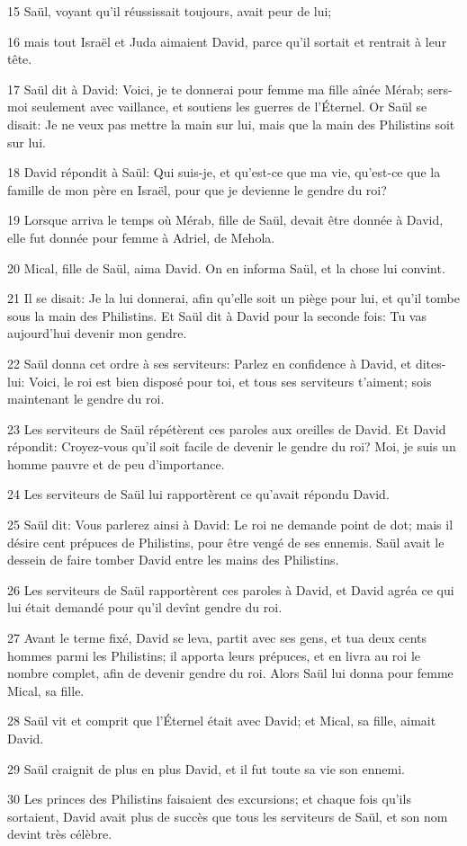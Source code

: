 \par 15 Saül, voyant qu'il réussissait toujours, avait peur de lui;
\par 16 mais tout Israël et Juda aimaient David, parce qu'il sortait et rentrait à leur tête.
\par 17 Saül dit à David: Voici, je te donnerai pour femme ma fille aînée Mérab; sers-moi seulement avec vaillance, et soutiens les guerres de l'Éternel. Or Saül se disait: Je ne veux pas mettre la main sur lui, mais que la main des Philistins soit sur lui.
\par 18 David répondit à Saül: Qui suis-je, et qu'est-ce que ma vie, qu'est-ce que la famille de mon père en Israël, pour que je devienne le gendre du roi?
\par 19 Lorsque arriva le temps où Mérab, fille de Saül, devait être donnée à David, elle fut donnée pour femme à Adriel, de Mehola.
\par 20 Mical, fille de Saül, aima David. On en informa Saül, et la chose lui convint.
\par 21 Il se disait: Je la lui donnerai, afin qu'elle soit un piège pour lui, et qu'il tombe sous la main des Philistins. Et Saül dit à David pour la seconde fois: Tu vas aujourd'hui devenir mon gendre.
\par 22 Saül donna cet ordre à ses serviteurs: Parlez en confidence à David, et dites-lui: Voici, le roi est bien disposé pour toi, et tous ses serviteurs t'aiment; sois maintenant le gendre du roi.
\par 23 Les serviteurs de Saül répétèrent ces paroles aux oreilles de David. Et David répondit: Croyez-vous qu'il soit facile de devenir le gendre du roi? Moi, je suis un homme pauvre et de peu d'importance.
\par 24 Les serviteurs de Saül lui rapportèrent ce qu'avait répondu David.
\par 25 Saül dit: Vous parlerez ainsi à David: Le roi ne demande point de dot; mais il désire cent prépuces de Philistins, pour être vengé de ses ennemis. Saül avait le dessein de faire tomber David entre les mains des Philistins.
\par 26 Les serviteurs de Saül rapportèrent ces paroles à David, et David agréa ce qui lui était demandé pour qu'il devînt gendre du roi.
\par 27 Avant le terme fixé, David se leva, partit avec ses gens, et tua deux cents hommes parmi les Philistins; il apporta leurs prépuces, et en livra au roi le nombre complet, afin de devenir gendre du roi. Alors Saül lui donna pour femme Mical, sa fille.
\par 28 Saül vit et comprit que l'Éternel était avec David; et Mical, sa fille, aimait David.
\par 29 Saül craignit de plus en plus David, et il fut toute sa vie son ennemi.
\par 30 Les princes des Philistins faisaient des excursions; et chaque fois qu'ils sortaient, David avait plus de succès que tous les serviteurs de Saül, et son nom devint très célèbre.

